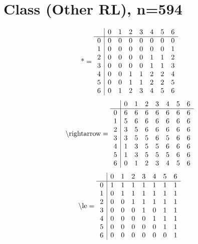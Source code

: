 \documentclass[11pt]{article}
\begin{document}
\section{Class (Other RL), n=594}
\[\text{*} = 
\begin{array}{r | r r r r r r r}
 & 0 & 1 & 2 & 3 & 4 & 5 & 6 \\ \hline
0 & 0 & 0 & 0 & 0 & 0 & 0 & 0 \\
1 & 0 & 0 & 0 & 0 & 0 & 0 & 1 \\
2 & 0 & 0 & 0 & 0 & 1 & 1 & 2 \\
3 & 0 & 0 & 0 & 0 & 1 & 1 & 3 \\
4 & 0 & 0 & 1 & 1 & 2 & 2 & 4 \\
5 & 0 & 0 & 1 & 1 & 2 & 2 & 5 \\
6 & 0 & 1 & 2 & 3 & 4 & 5 & 6 \\
\end{array}
\]
\[\text{\textbackslash rightarrow} = 
\begin{array}{r | r r r r r r r}
 & 0 & 1 & 2 & 3 & 4 & 5 & 6 \\ \hline
0 & 6 & 6 & 6 & 6 & 6 & 6 & 6 \\
1 & 5 & 6 & 6 & 6 & 6 & 6 & 6 \\
2 & 3 & 5 & 6 & 6 & 6 & 6 & 6 \\
3 & 3 & 5 & 5 & 6 & 5 & 6 & 6 \\
4 & 1 & 3 & 5 & 5 & 6 & 6 & 6 \\
5 & 1 & 3 & 5 & 5 & 5 & 6 & 6 \\
6 & 0 & 1 & 2 & 3 & 4 & 5 & 6 \\
\end{array}
\]
\[\text{\textbackslash le} = 
\begin{array}{r | r r r r r r r}
 & 0 & 1 & 2 & 3 & 4 & 5 & 6 \\ \hline
0 & 1 & 1 & 1 & 1 & 1 & 1 & 1 \\
1 & 0 & 1 & 1 & 1 & 1 & 1 & 1 \\
2 & 0 & 0 & 1 & 1 & 1 & 1 & 1 \\
3 & 0 & 0 & 0 & 1 & 0 & 1 & 1 \\
4 & 0 & 0 & 0 & 0 & 1 & 1 & 1 \\
5 & 0 & 0 & 0 & 0 & 0 & 1 & 1 \\
6 & 0 & 0 & 0 & 0 & 0 & 0 & 1 \\
\end{array}
\]
\end{document}
